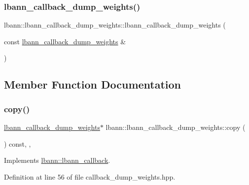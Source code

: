 \subsubsection{\texorpdfstring{lbann\+\_\+callback\+\_\+dump\+\_\+weights()}{lbann\_callback\_dump\_weights()}\hspace{0.1cm}{\footnotesize\ttfamily [2/2]}}
{\footnotesize\ttfamily lbann\+::lbann\+\_\+callback\+\_\+dump\+\_\+weights\+::lbann\+\_\+callback\+\_\+dump\+\_\+weights (\begin{DoxyParamCaption}\item[{const \hyperlink{classlbann_1_1lbann__callback__dump__weights}{lbann\+\_\+callback\+\_\+dump\+\_\+weights} \&}]{ }\end{DoxyParamCaption})\hspace{0.3cm}{\ttfamily [default]}}



\subsection{Member Function Documentation}
\mbox{\label{classlbann_1_1lbann__callback__dump__weights_a5e3d078ea54f8768e23aac2393b1bc3c}} 
\subsubsection{\texorpdfstring{copy()}{copy()}}
{\footnotesize\ttfamily \hyperlink{classlbann_1_1lbann__callback__dump__weights}{lbann\+\_\+callback\+\_\+dump\+\_\+weights}$\ast$ lbann\+::lbann\+\_\+callback\+\_\+dump\+\_\+weights\+::copy (\begin{DoxyParamCaption}{ }\end{DoxyParamCaption}) const\hspace{0.3cm}{\ttfamily [inline]}, {\ttfamily [override]}, {\ttfamily [virtual]}}



Implements \hyperlink{classlbann_1_1lbann__callback_a9f545d1269a8c7af335625d049691f26}{lbann\+::lbann\+\_\+callback}.



Definition at line 56 of file callback\+\_\+dump\+\_\+weights.\+hpp.


